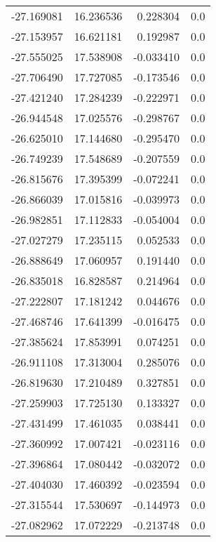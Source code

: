 \begin{tabular}{rrrr}
      -27.169081 &        16.236536 &    0.228304 &   0.0 \\
      -27.153957 &        16.621181 &    0.192987 &   0.0 \\
      -27.555025 &        17.538908 &   -0.033410 &   0.0 \\
      -27.706490 &        17.727085 &   -0.173546 &   0.0 \\
      -27.421240 &        17.284239 &   -0.222971 &   0.0 \\
      -26.944548 &        17.025576 &   -0.298767 &   0.0 \\
      -26.625010 &        17.144680 &   -0.295470 &   0.0 \\
      -26.749239 &        17.548689 &   -0.207559 &   0.0 \\
      -26.815676 &        17.395399 &   -0.072241 &   0.0 \\
      -26.866039 &        17.015816 &   -0.039973 &   0.0 \\
      -26.982851 &        17.112833 &   -0.054004 &   0.0 \\
      -27.027279 &        17.235115 &    0.052533 &   0.0 \\
      -26.888649 &        17.060957 &    0.191440 &   0.0 \\
      -26.835018 &        16.828587 &    0.214964 &   0.0 \\
      -27.222807 &        17.181242 &    0.044676 &   0.0 \\
      -27.468746 &        17.641399 &   -0.016475 &   0.0 \\
      -27.385624 &        17.853991 &    0.074251 &   0.0 \\
      -26.911108 &        17.313004 &    0.285076 &   0.0 \\
      -26.819630 &        17.210489 &    0.327851 &   0.0 \\
      -27.259903 &        17.725130 &    0.133327 &   0.0 \\
      -27.431499 &        17.461035 &    0.038441 &   0.0 \\
      -27.360992 &        17.007421 &   -0.023116 &   0.0 \\
      -27.396864 &        17.080442 &   -0.032072 &   0.0 \\
      -27.404030 &        17.460392 &   -0.023594 &   0.0 \\
      -27.315544 &        17.530697 &   -0.144973 &   0.0 \\
      -27.082962 &        17.072229 &   -0.213748 &   0.0 \\

\end{tabular}
